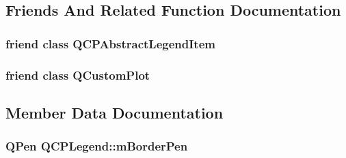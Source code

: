 \subsection{Friends And Related Function Documentation}
\hypertarget{class_q_c_p_legend_a8a375e31e42c68de049fcf0fd35db5b0}{}
\subsubsection[{Q\+C\+P\+Abstract\+Legend\+Item}]{\setlength{\rightskip}{0pt plus 5cm}friend class {\bf Q\+C\+P\+Abstract\+Legend\+Item}\hspace{0.3cm}{\ttfamily [friend]}}\label{class_q_c_p_legend_a8a375e31e42c68de049fcf0fd35db5b0}
\hypertarget{class_q_c_p_legend_a1cdf9df76adcfae45261690aa0ca2198}{}
\subsubsection[{Q\+Custom\+Plot}]{\setlength{\rightskip}{0pt plus 5cm}friend class {\bf Q\+Custom\+Plot}\hspace{0.3cm}{\ttfamily [friend]}}\label{class_q_c_p_legend_a1cdf9df76adcfae45261690aa0ca2198}


\subsection{Member Data Documentation}
\hypertarget{class_q_c_p_legend_a52ab8342a382456131d567f962d7f9d0}{}
\subsubsection[{m\+Border\+Pen}]{\setlength{\rightskip}{0pt plus 5cm}Q\+Pen Q\+C\+P\+Legend\+::m\+Border\+Pen\hspace{0.3cm}{\ttfamily [protected]}}\label{class_q_c_p_legend_a52ab8342a382456131d567f962d7f9d0}
\hypertarget{class_q_c_p_legend_a9bd7cd05a9a485e06eda513a348baf80}{}
